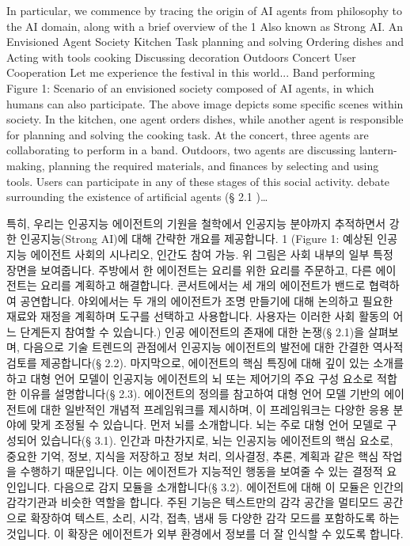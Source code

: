 \documentclass[11pt,a4paper,oneside]{memoir}
\begin{document}
\begin{tcolorbox}[origstyle]
\small In particular, we commence by tracing the origin of AI agents from philosophy to the AI domain, along with a brief overview of the 1 Also known as Strong AI. An Envisioned Agent Society Kitchen Task planning and solving Ordering dishes and Acting with tools cooking Discussing decoration Outdoors Concert User Cooperation Let me experience the festival in this world... Band performing Figure 1: Scenario of an envisioned society composed of AI agents, in which humans can also participate. The above image depicts some specific scenes within society. In the kitchen, one agent orders dishes, while another agent is responsible for planning and solving the cooking task. At the concert, three agents are collaborating to perform in a band. Outdoors, two agents are discussing lantern-making, planning the required materials, and finances by selecting and using tools. Users can participate in any of these stages of this social activity. debate surrounding the existence of artificial agents (§ 2.1 )\ldots
\end{tcolorbox}
\vspace{0.3em}

\begin{tcolorbox}[kostyle]
특히, 우리는 인공지능 에이전트의 기원을 철학에서 인공지능 분야까지 추적하면서 강한 인공지능(Strong AI)에 대해 간략한 개요를 제공합니다. 1 (Figure 1: 예상된 인공지능 에이전트 사회의 시나리오, 인간도 참여 가능. 위 그림은 사회 내부의 일부 특정 장면을 보여줍니다. 주방에서 한 에이전트는 요리를 위한 요리를 주문하고, 다른 에이전트는 요리를 계획하고 해결합니다. 콘서트에서는 세 개의 에이전트가 밴드로 협력하여 공연합니다. 야외에서는 두 개의 에이전트가 조명 만들기에 대해 논의하고 필요한 재료와 재정을 계획하며 도구를 선택하고 사용합니다. 사용자는 이러한 사회 활동의 어느 단계든지 참여할 수 있습니다.) 인공 에이전트의 존재에 대한 논쟁(§ 2.1)을 살펴보며, 다음으로 기술 트렌드의 관점에서 인공지능 에이전트의 발전에 대한 간결한 역사적 검토를 제공합니다(§ 2.2). 마지막으로, 에이전트의 핵심 특징에 대해 깊이 있는 소개를 하고 대형 언어 모델이 인공지능 에이전트의 뇌 또는 제어기의 주요 구성 요소로 적합한 이유를 설명합니다(§ 2.3). 에이전트의 정의를 참고하여 대형 언어 모델 기반의 에이전트에 대한 일반적인 개념적 프레임워크를 제시하며, 이 프레임워크는 다양한 응용 분야에 맞게 조정될 수 있습니다. 먼저 뇌를 소개합니다. 뇌는 주로 대형 언어 모델로 구성되어 있습니다(§ 3.1). 인간과 마찬가지로, 뇌는 인공지능 에이전트의 핵심 요소로, 중요한 기억, 정보, 지식을 저장하고 정보 처리, 의사결정, 추론, 계획과 같은 핵심 작업을 수행하기 때문입니다. 이는 에이전트가 지능적인 행동을 보여줄 수 있는 결정적 요인입니다. 다음으로 감지 모듈을 소개합니다(§ 3.2). 에이전트에 대해 이 모듈은 인간의 감각기관과 비슷한 역할을 합니다. 주된 기능은 텍스트만의 감각 공간을 멀티모드 공간으로 확장하여 텍스트, 소리, 시각, 접촉, 냄새 등 다양한 감각 모드를 포함하도록 하는 것입니다. 이 확장은 에이전트가 외부 환경에서 정보를 더 잘 인식할 수 있도록 합니다.
\end{tcolorbox}
\vspace{0.8em}
\end{document}
